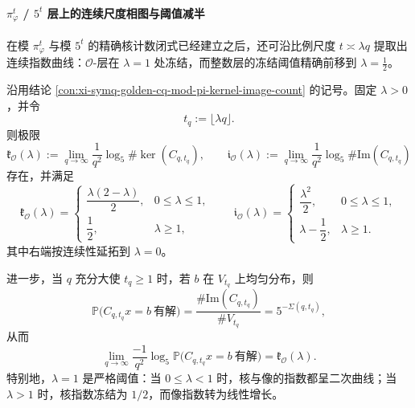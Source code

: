 \paragraph{\texorpdfstring{$\pi_\varphi^t$}{pi^t} / \texorpdfstring{$5^t$}{5^t} 层上的连续尺度相图与阈值减半}
在模 \(\pi_\varphi^t\) 与模 \(5^t\) 的精确核计数闭式已经建立之后，还可沿比例尺度 \(t\asymp \lambda q\) 提取出连续指数曲线：\(\mathcal O\)-层在 \(\lambda=1\) 处冻结，而整数层的冻结阈值精确前移到 \(\lambda=\frac12\)。

\begin{theorem}[模 \texorpdfstring{$\pi_\varphi^t$}{pi^t} 层上的核—像指数存在阈值 \texorpdfstring{$\lambda=1$}{lambda=1} 的二次相变]\label{thm:xi-symq-golden-cq-modpi-quadratic-phase-transition}
沿用结论 \ref{con:xi-symq-golden-cq-mod-pi-kernel-image-count} 的记号。固定 \(\lambda>0\)，并令
\[
t_q:=\lfloor \lambda q\rfloor.
\]
则极限
\[
\mathfrak k_{\mathcal O}(\lambda)
:=
\lim_{q\to\infty}\frac{1}{q^2}\log_5\#\ker(C_{q,t_q}),
\qquad
\mathfrak i_{\mathcal O}(\lambda)
:=
\lim_{q\to\infty}\frac{1}{q^2}\log_5\#\mathrm{Im}(C_{q,t_q})
\]
存在，并满足
\[
\boxed{\;
\mathfrak k_{\mathcal O}(\lambda)=
\begin{cases}
\dfrac{\lambda(2-\lambda)}{2},& 0\le \lambda\le 1,\\[6pt]
\dfrac12,& \lambda\ge 1,
\end{cases}
\qquad
\mathfrak i_{\mathcal O}(\lambda)=
\begin{cases}
\dfrac{\lambda^2}{2},& 0\le \lambda\le 1,\\[6pt]
\lambda-\dfrac12,& \lambda\ge 1.
\end{cases}
\;}
\]
其中右端按连续性延拓到 \(\lambda=0\)。

进一步，当 \(q\) 充分大使 \(t_q\ge 1\) 时，若 \(b\) 在 \(V_{t_q}\) 上均匀分布，则
\[
\mathbb P\!\bigl(C_{q,t_q}x=b\ \text{有解}\bigr)
=
\frac{\#\mathrm{Im}(C_{q,t_q})}{\#V_{t_q}}
=
5^{-\Sigma(q,t_q)},
\]
从而
\[
\lim_{q\to\infty}\frac{-1}{q^2}\log_5
\mathbb P\!\bigl(C_{q,t_q}x=b\ \text{有解}\bigr)
=
\mathfrak k_{\mathcal O}(\lambda).
\]
特别地，\(\lambda=1\) 是严格阈值：当 \(0\le \lambda<1\) 时，核与像的指数都呈二次曲线；当 \(\lambda>1\) 时，核指数冻结为 \(1/2\)，而像指数转为线性增长。
\end{theorem}
